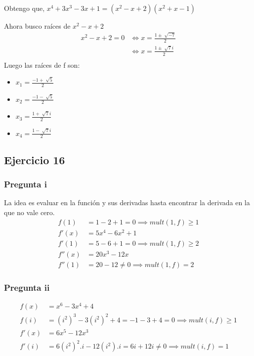 Obtengo que, $ x^4 + 3x^3 - 3x + 1 = (x^2 - x + 2)(x^2 + x - 1) $

Ahora busco raíces de $ x^2 - x + 2 $
\begin{align*}
    x^2 - x + 2 = 0 &\iff x = \frac{1 \pm \sqrt[]{-7}}{2} \\
    &\iff x = \frac{1 \pm \sqrt[]{7}i}{2} \\
\end{align*}
Luego las raíces de f son:
\begin{itemize}
    \item $ x_1 = \frac{-1 + \sqrt[]{5}}{2} $
    \item $ x_2 = \frac{-1 - \sqrt[]{5}}{2} $
    \item $ x_3 = \frac{1 + \sqrt[]{7}i}{2} $
    \item $ x_4 = \frac{1 - \sqrt[]{7}i}{2} $
\end{itemize}

\subsection{Ejercicio 16}

\subsubsection{Pregunta i}
La idea es evaluar en la función y sus derivadas hasta encontrar la derivada en la que no vale cero.
\begin{align*}
    f(1) &= 1-2+1 = 0 \implies mult(1,f) \geq 1 \\
    f'(x) &= 5x^4 - 6x^2 + 1 \\
    f'(1) &= 5-6+1 = 0 \implies mult(1,f) \geq 2 \\
    f''(x) &= 20x^3 - 12x \\
    f''(1) &= 20-12 \neq 0 \implies mult(1,f) = 2
\end{align*}

\subsubsection{Pregunta ii}
\begin{align*}
    f(x) &= x^6 - 3x^4 + 4 \\
    f(i) &= (i^2)^3 - 3(i^2)^2 + 4 = -1-3+4 = 0 \implies mult(i,f) \geq 1 \\
    f'(x) &= 6x^5 - 12x^3 \\
    f'(i) &= 6(i^2)^2 . i - 12(i^2).i = 6i+12i \neq 0 \implies mult(i,f) = 1 \\
\end{align*}

